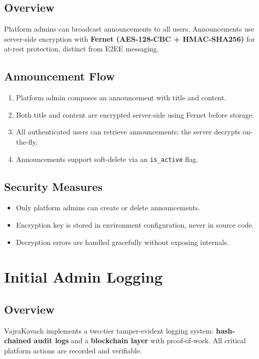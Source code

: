 \documentclass[12pt,a4paper]{article}
\begin{document}
\subsection{Overview}
Platform admins can broadcast announcements to all users. Announcements use server-side encryption with \textbf{Fernet (AES-128-CBC + HMAC-SHA256)} for at-rest protection, distinct from E2EE messaging.

\subsection{Announcement Flow}
\begin{enumerate}
  \item Platform admin composes an announcement with title and content.
  \item Both title and content are encrypted server-side using Fernet before storage.
  \item All authenticated users can retrieve announcements; the server decrypts on-the-fly.
  \item Announcements support soft-delete via an \texttt{is\_active} flag.
\end{enumerate}

\subsection{Security Measures}
\begin{itemize}
  \item Only platform admins can create or delete announcements.
  \item Encryption key is stored in environment configuration, never in source code.
  \item Decryption errors are handled gracefully without exposing internals.
\end{itemize}

\newpage

\section{Initial Admin Logging}

\subsection{Overview}
VajraKavach implements a two-tier tamper-evident logging system: \textbf{hash-chained audit logs} and a \textbf{blockchain layer} with proof-of-work. All critical platform actions are recorded and verifiable.
\end{document}
